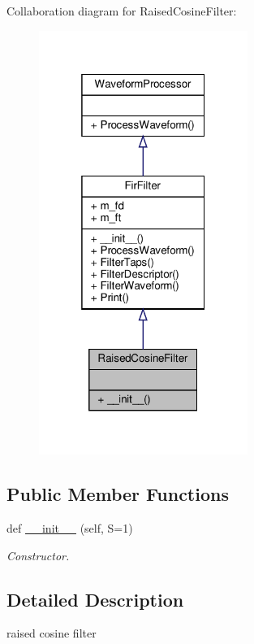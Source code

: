 Collaboration diagram for Raised\+Cosine\+Filter\+:\nopagebreak
\begin{figure}[H]
\begin{center}
\leavevmode
\includegraphics[width=193pt]{classSignalIntegrity_1_1TimeDomain_1_1Filters_1_1RaisedCosineFilter_1_1RaisedCosineFilter__coll__graph}
\end{center}
\end{figure}
\subsection*{Public Member Functions}
\begin{DoxyCompactItemize}
\item 
def \hyperlink{classSignalIntegrity_1_1TimeDomain_1_1Filters_1_1RaisedCosineFilter_1_1RaisedCosineFilter_a59c1eb244c4627d0d84564a3dffb5687}{\+\_\+\+\_\+init\+\_\+\+\_\+} (self, S=1)
\begin{DoxyCompactList}\small\item\em Constructor. \end{DoxyCompactList}\end{DoxyCompactItemize}


\subsection{Detailed Description}
raised cosine filter 

